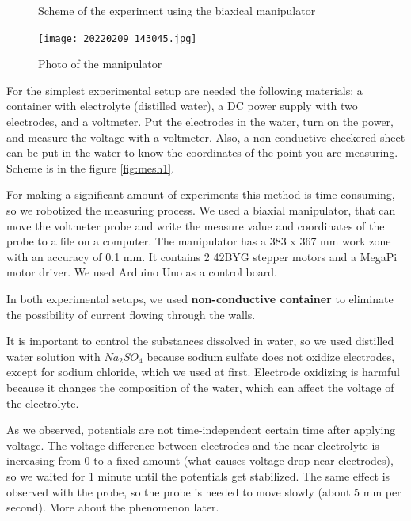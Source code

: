 \documentclass{article}
\begin{document}
\begin{figure}[h]
\begin{center}
\begin{minipage}[h]{0.47\linewidth}
			\caption{Scheme of the experiment using the biaxical manipulator}
			\label{fig:mesh2}
		\end{minipage}
	\end{center}
\end{figure}


\begin{figure}[h]
	\begin{center}
		\texttt{[image: 20220209\_143045.jpg]}
		\caption{Photo of the manipulator}
		\label{manipulator_photo}
	\end{center}
\end{figure}



For the simplest experimental setup are needed the following materials: a container with electrolyte (distilled water), a DC power supply with two electrodes, and a voltmeter. Put the electrodes in the water, turn on the power, and measure the voltage with a voltmeter. Also, a non-conductive checkered sheet can be put in the water to know the coordinates of the point you are measuring. Scheme is in the figure \ref{fig:mesh1}.  \par

For making a significant amount of experiments this method is time-consuming, so we robotized the measuring process. We used a biaxial manipulator, that can move the voltmeter probe and write the measure value and coordinates of the probe to a file on a computer. The manipulator has a 383 x 367 mm work zone with an accuracy of 0.1 mm. It contains 2 42BYG stepper motors and a MegaPi motor driver. We used Arduino Uno as a control board.


In both experimental setups, we used \textbf{non-conductive container} to eliminate the possibility of current flowing through the walls.\par

It is important to control the substances dissolved in water, so we used distilled water solution with $Na_2SO_4$ because sodium sulfate does not oxidize electrodes, except for sodium chloride, which we used at first. Electrode oxidizing is harmful because it changes the composition of the water, which can affect the voltage of the electrolyte.\par

As we observed, potentials are not time-independent certain time after applying voltage. The voltage difference between electrodes and the near electrolyte is increasing from 0 to a fixed amount (what causes voltage drop near electrodes), so we waited for 1 minute until the potentials get stabilized. The same effect is observed with the probe, so the probe is needed to move slowly (about 5 mm per second). More about the phenomenon later. \par
\end{document}
